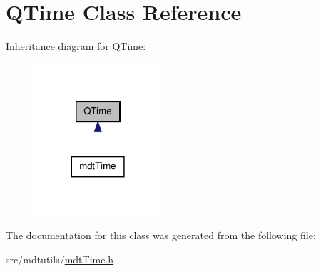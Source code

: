 \hypertarget{class_q_time}{\section{Q\-Time Class Reference}
\label{class_q_time}
}


Inheritance diagram for Q\-Time\-:
\nopagebreak
\begin{figure}[H]
\begin{center}
\leavevmode
\includegraphics[width=134pt]{class_q_time__inherit__graph}
\end{center}
\end{figure}


The documentation for this class was generated from the following file\-:\begin{DoxyCompactItemize}
\item 
src/mdtutils/\hyperlink{mdt_time_8h}{mdt\-Time.\-h}\end{DoxyCompactItemize}
